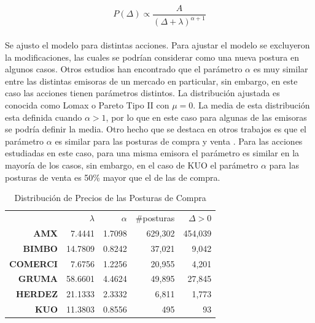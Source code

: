 \documentclass[11pt]{article}
\numberwithin{equation}{section} %
\begin{document}
\begin{equation}
P\left(\Delta\right) \propto \frac{A}{{\left(\Delta+\lambda\right)}^{\alpha+1}}
\end{equation}
\\

Se ajusto el modelo para distintas acciones. Para ajustar el modelo se excluyeron la modificaciones, las cuales se podrían considerar como una nueva postura en algunos casos. Otros estudios han encontrado que el parámetro $\alpha$ es muy similar entre las distintas emisoras \cite{zovko2002power} de un mercado en particular, sin embargo, en este caso las acciones tienen parámetros distintos. La distribución ajustada es conocida como Lomax o Pareto Tipo II con $\mu=0$. La media de esta distribución esta definida cuando $\alpha>1$, por lo que en este caso para algunas de las emisoras se podría definir la media. Otro hecho que se destaca en otros trabajos es que el parámetro $\alpha$ es similar para las posturas de compra y venta \cite{Bouchaud2002}. Para las acciones estudiadas en este caso, para una misma emisora el parámetro es similar en la mayoría de los casos, sin embargo, en el caso de KUO el parámetro $\alpha$ para las posturas de venta es 50\% mayor que el de las de compra.\\

\begin{table}[htbp]
\centering
\caption{Distribución de Precios de las Posturas de Compra}
\begin{tabular}{r|r|r|r|r|}
\cline{2-5}
& $\lambda$ & $\alpha$ & \#posturas & $\Delta>0$ \\
\cline{2-5}
\textbf{AMX}   & 7.4441 & 1.7098 & 629,302 & 454,039 \\
\textbf{BIMBO} & 14.7809 & 0.8242 & 37,021 & 9,042 \\
\textbf{COMERCI}   & 7.6756 & 1.2256 & 20,955 & 4,201 \\
\textbf{GRUMA} & 58.6601 & 4.4624 & 49,895 & 27,845 \\
\textbf{HERDEZ} & 21.1333 & 2.3332 & 6,811 & 1,773 \\
\textbf{KUO}   & 11.3803 & 0.8556 & 495   & 93 \\
\cline{2-5}
\end{tabular}%
\label{tab:powercompra}%
\end{table}%
\end{document}
